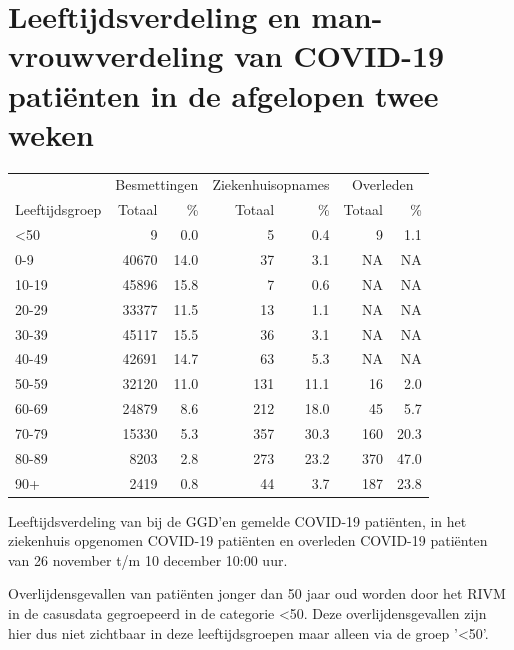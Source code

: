 \documentclass[
  english,
  man,floatsintext]{apa6}
\begin{document}
\hypertarget{leeftijdsverdeling-en-man-vrouwverdeling-van-covid-19-patiuxebnten-in-de-afgelopen-twee-weken}{%
\section{Leeftijdsverdeling en man-vrouwverdeling van COVID-19 patiënten in de afgelopen twee weken}\label{leeftijdsverdeling-en-man-vrouwverdeling-van-covid-19-patiuxebnten-in-de-afgelopen-twee-weken}}

\begin{table}
\centering\begingroup\fontsize{11}{13}\selectfont

\begin{threeparttable}
\begin{tabular}{lrrrrrr}
\toprule
\multicolumn{1}{c}{ } & \multicolumn{2}{c}{Besmettingen} & \multicolumn{2}{c}{Ziekenhuisopnames} & \multicolumn{2}{c}{Overleden} \\
\cmidrule(l{3pt}r{3pt}){2-3} \cmidrule(l{3pt}r{3pt}){4-5} \cmidrule(l{3pt}r{3pt}){6-7}
Leeftijdsgroep & Totaal & \% & Totaal & \% & Totaal & \%\\
\midrule
<50 & 9 & 0.0 & 5 & 0.4 & 9 & 1.1\\
0-9 & 40670 & 14.0 & 37 & 3.1 & NA & NA\\
10-19 & 45896 & 15.8 & 7 & 0.6 & NA & NA\\
20-29 & 33377 & 11.5 & 13 & 1.1 & NA & NA\\
30-39 & 45117 & 15.5 & 36 & 3.1 & NA & NA\\
40-49 & 42691 & 14.7 & 63 & 5.3 & NA & NA\\
50-59 & 32120 & 11.0 & 131 & 11.1 & 16 & 2.0\\
60-69 & 24879 & 8.6 & 212 & 18.0 & 45 & 5.7\\
70-79 & 15330 & 5.3 & 357 & 30.3 & 160 & 20.3\\
80-89 & 8203 & 2.8 & 273 & 23.2 & 370 & 47.0\\
90+ & 2419 & 0.8 & 44 & 3.7 & 187 & 23.8\\
\bottomrule
\end{tabular}
\begin{tablenotes}
\item[1] Leeftijdsverdeling van bij de GGD’en gemelde COVID-19 patiënten, in het ziekenhuis opgenomen COVID-19 patiënten en overleden COVID-19 patiënten van 26 november t/m 10 december 10:00 uur.
\item[2] Overlijdensgevallen van patiënten jonger dan 50 jaar oud worden door het RIVM in de casusdata gegroepeerd in de categorie <50. Deze overlijdensgevallen zijn hier dus niet zichtbaar in deze leeftijdsgroepen maar alleen via de groep '<50'.
\end{tablenotes}
\end{threeparttable}
\endgroup{}
\end{table}
\end{document}

